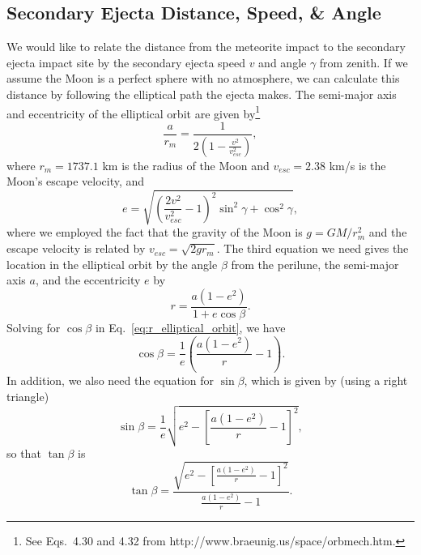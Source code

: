 \documentclass{hitec}
\numberwithin{equation}{section}
\begin{document}
\subsection{Secondary Ejecta Distance, Speed, \& Angle}
\label{ssec:SecondaryEjectaDistanceSpeedAngle}
We would like to relate the distance from the meteorite impact to the secondary ejecta impact site by the secondary ejecta speed $v$ and angle $\gamma$ from zenith. If we assume the Moon is a perfect sphere with no atmosphere, we can calculate this distance by following the elliptical path the ejecta makes. The semi-major axis and eccentricity of the elliptical orbit are given by\footnote{See Eqs.\ 4.30 and 4.32 from http://www.braeunig.us/space/orbmech.htm.}
\begin{equation}\label{eq:a_of_v}
\frac{a}{r_m} = \frac{1}{2\left(1-\frac{v^2}{v_{esc}^2}\right)},
\end{equation}
where $r_m = 1737.1$ km is the radius of the Moon and $v_{esc} = 2.38$ km/s is the Moon's escape velocity, and
\begin{equation}\label{eq:e_of_v}
e = \sqrt{\left(\frac{2v^2}{v_{esc}^2}-1\right)^2\sin^2\gamma + \cos^2\gamma},
\end{equation}
where we employed the fact that the gravity of the Moon is $g = GM/r_m^2$ and the escape velocity is related by $v_{esc} = \sqrt{2gr_m}$. The third equation we need gives the location in the elliptical orbit by the angle $\beta$ from the perilune, the semi-major axis $a$, and the eccentricity $e$ by
\begin{equation}\label{eq:r_elliptical_orbit}
r = \frac{a(1-e^2)}{1+e\cos\beta}.
\end{equation}
Solving for $\cos\beta$ in Eq.\ \ref{eq:r_elliptical_orbit}, we have
\begin{equation}\label{eq:cos_elliptical_orbit}
\cos\beta = \frac{1}{e}\left(\frac{a(1-e^2)}{r}-1\right).
\end{equation}
In addition, we also need the equation for $\sin\beta$, which is given by (using a right triangle)
\begin{equation}
\sin\beta = \frac{1}{e}\sqrt{e^2-\left[\frac{a(1-e^2)}{r}-1\right]^2},
\end{equation}
so that $\tan\beta$ is
\begin{equation}\label{eq:tan_beta}
\tan\beta = \frac{\sqrt{e^2-\left[\frac{a(1-e^2)}{r}-1\right]^2}}{\frac{a(1-e^2)}{r}-1}.
\end{equation}
\end{document}
